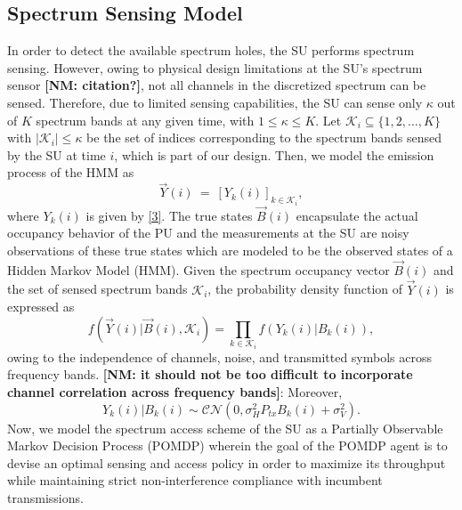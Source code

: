 \documentclass[10pt,twocolumn]{IEEEtran}
\newcommand{\nm}[1]{{\color{blue}\bf{[NM: #1]}}}
\newcommand{\bk}[1]{{\color{red}{[BK: #1]}}}
\begin{document}
\subsection{Spectrum Sensing Model}
In order to detect the available spectrum holes, the SU performs spectrum sensing. However, owing to physical design limitations at the SU's spectrum sensor \nm{citation?}, not all channels in the discretized spectrum can be sensed. Therefore, due to limited sensing capabilities, the SU can sense only $\kappa$ out of $K$ spectrum bands at any given time, with $1\leq \kappa\leq K$. Let $\mathcal K_{i}\subseteq\{1,2,\dots,K\}$ with $|\mathcal K_i|\leq \kappa$ be the set of indices corresponding to the spectrum bands sensed by the SU at time $i$, which is part of our design. Then, we model the emission process of the HMM as 
\begin{equation}\label{8}
    \vec{Y}(i)\ =\ [Y_k(i)]_{k\in\mathcal K_i},
\end{equation}
where $Y_k(i)$ is given by \eqref{3}.
The true states $\vec{B}(i)$ encapsulate the actual occupancy behavior of the PU and the measurements at the SU are noisy observations of these true states which are modeled to be the observed states of a Hidden Markov Model (HMM). Given the spectrum occupancy vector $\vec{B}(i)$ and the set of sensed spectrum bands $\mathcal K_i$, the probability density function of $\vec{Y}(i)$ is expressed as
\begin{equation}\label{9}
    f(\vec{Y}(i)|\vec{B}(i),\mathcal K_i)=\prod_{k\in\mathcal K_i}f(Y_k(i)|B_k(i)),
\end{equation}
owing to the independence of channels, noise, and transmitted symbols across frequency bands. 
\nm{it should not be too difficult to incorporate channel correlation across frequency bands}: \bk{What does this mean? Given the states, the observations are independent across channels. So, why do we need to talk about channel correlation here?}
Moreover,
\begin{equation}\label{10}
 Y_k(i)|B_k(i)\sim \mathcal{CN}(0,\sigma_H^2P_{tx}B_k(i)+\sigma_V^2).
\end{equation}
Now, we model the spectrum access scheme of the SU as a Partially Observable Markov Decision Process (POMDP) wherein the goal of the POMDP agent is to devise an optimal sensing and access policy in order to maximize its throughput while maintaining strict non-interference compliance with incumbent transmissions.
\end{document}
